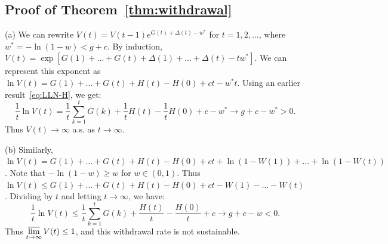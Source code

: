 \documentclass[12pt]{amsart}
\theoremstyle{definition}
\begin{document}
\subsection{Proof of Theorem~\ref{thm:withdrawal}} (a) We can rewrite $V(t) = V(t-1)e^{G(t)+\Delta(t) - w^*}$ for $t = 1, 2, \ldots$, where $w^* = -\ln(1 - w) < g + c$. By induction, $V(t) = \exp\left[G(1)+\ldots + G(t) + \Delta(1) + \ldots + \Delta(t) - tw^*\right]$. We can represent this exponent as $\ln V(t) = G(1) + \ldots + G(t) + H(t) - H(0) + ct - w^*t$. Using an earlier result~\eqref{eq:LLN-H}, we get:
$$
\frac1t\ln V(t) = \frac1t\sum\limits_{k=1}^tG(k) + \frac1tH(t) - \frac1tH(0) + c - w^* \to g + c - w^* > 0.
$$
Thus $V(t) \to \infty$ a.s. as $t \to \infty$. 

(b) Similarly,  $\ln V(t) = G(1) + \ldots + G(t) + H(t) - H(0) + ct + \ln(1 - W(1)) + \ldots + \ln(1 - W(t))$. Note that $-\ln(1 - w) \ge w$ for $w \in (0, 1)$. Thus $\ln V(t) \le G(1) + \ldots + G(t) + H(t) - H(0) + ct - W(1) - \ldots - W(t)$. Dividing by $t$ and letting $t \to \infty$, we have: 
$$
\frac1t\ln V(t) \le \frac1t\sum\limits_{k=1}^tG(k) + \frac{H(t)}t - \frac{H(0)}t + c  \to g + c - w < 0.
$$
Thus $\varlimsup\limits_{t \to \infty} V(t) \le 1$, and this withdrawal rate is not sustainable. 



%
%
%
%
\end{document}
